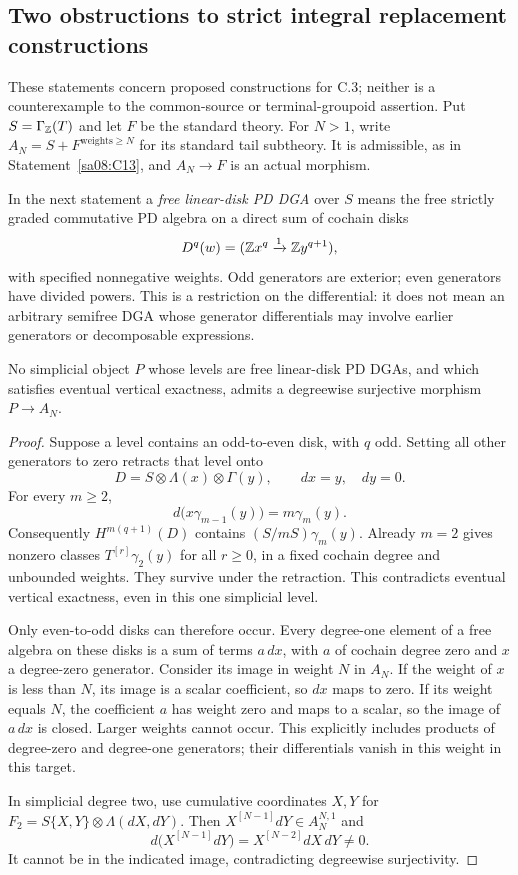 \subsection{Two obstructions to strict integral replacement constructions}

These statements concern proposed constructions for C.3; neither is a
counterexample to the common-source or terminal-groupoid assertion.
Put $S=\Gamma_{\mathbb Z}(T)$ and let $F$ be the standard theory. For $N>1$,
write $A_N=S+F^{\mathrm{weights}\geq N}$ for its standard tail
subtheory. It is admissible, as in Statement~\ref{sa08:C13}, and
$A_N\to F$ is an actual morphism.

In the next statement a \emph{free linear-disk PD DGA} over $S$
means the free strictly graded commutative PD algebra on a direct
sum of cochain disks
\[
 D^q(w)=(\mathbb Z x^q\xrightarrow{1}\mathbb Z y^{q+1}),
\]
with specified nonnegative weights. Odd generators are exterior;
even generators have divided powers. This is a restriction on
the differential: it does not mean an arbitrary semifree DGA
whose generator differentials may involve earlier generators
or decomposable expressions.

\begin{proposition}
\label{sa08:C14}
No simplicial object $P$ whose levels are free linear-disk PD
DGAs, and which satisfies eventual vertical exactness, admits
a degreewise surjective morphism $P\to A_N$.
\end{proposition}
\begin{proof}
Suppose a level contains an odd-to-even disk, with $q$ odd.
Setting all other generators to zero retracts that level onto
\[
 D=S\otimes\Lambda(x)\otimes\Gamma(y),\qquad dx=y,\quad dy=0.
\]
For every $m\geq2$,
\[
 d\bigl(x\gamma_{m-1}(y)\bigr)=m\gamma_m(y).
\]
Consequently $H^{m(q+1)}(D)$ contains
$(S/mS)\gamma_m(y)$. Already $m=2$ gives nonzero classes
$T^{[r]}\gamma_2(y)$ for all $r\geq0$, in a fixed cochain
degree and unbounded weights. They survive under the
retraction. This contradicts eventual vertical exactness,
even in this one simplicial level.

Only even-to-odd disks can therefore occur. Every degree-one
element of a free algebra on these disks is a sum of terms
$a\,dx$, with $a$ of cochain degree zero and $x$ a degree-zero
generator. Consider its image in weight $N$ in $A_N$.
If the weight of $x$ is less than $N$, its image is a scalar
coefficient, so $dx$ maps to zero. If its weight equals $N$,
the coefficient $a$ has weight zero and maps to a scalar,
so the image of $a\,dx$ is closed. Larger weights cannot
occur. This explicitly includes products of degree-zero
and degree-one generators; their differentials vanish in
this weight in this target.

In simplicial degree two, use cumulative coordinates
$X,Y$ for
$F_2=S\{X,Y\}\otimes\Lambda(dX,dY)$. Then
$X^{[N-1]}dY\in A_N^{N,1}$ and
\[
 d\bigl(X^{[N-1]}dY\bigr)
 =X^{[N-2]}dX\,dY\ne0.
\]
It cannot be in the indicated image, contradicting
degreewise surjectivity.
\end{proof}

